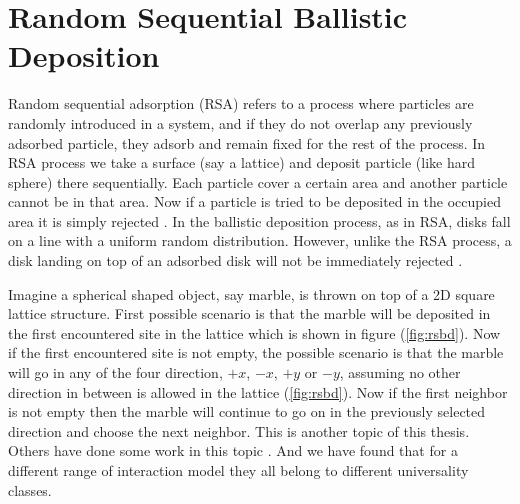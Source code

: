 		
		

\section{Random Sequential Ballistic Deposition}

	Random sequential adsorption (RSA) refers to a process where particles are randomly introduced in a system, and if they do not overlap any previously adsorbed particle, they adsorb and remain fixed for the rest of the process.	In RSA process we take a surface (say a lattice) and deposit particle (like hard sphere) there sequentially. Each particle cover a certain area and another particle cannot be in that area. Now if a particle is tried to be deposited in the occupied area it is simply rejected \cite{Renyi1958, Widom1966}.	In the ballistic deposition process, as in RSA, disks fall	on a line with a uniform random distribution. However,	unlike the RSA process, a disk landing on top of an adsorbed disk will not be immediately rejected \cite{Talbot1992}.

	Imagine a spherical shaped object, say marble, is thrown on top of a 2D square lattice structure. First possible scenario is that the marble will be deposited in the first encountered site in the lattice which is shown in figure (\ref{fig:rsbd}). Now if the first encountered site is not empty, the possible scenario is that the marble will go in any of the four direction, $+x$, $-x$, $+y$ or $-y$, assuming no other direction in between is allowed in the lattice (\ref{fig:rsbd}).  Now if the first neighbor is not empty then the marble will continue to go on in the previously selected direction and choose the next neighbor. This is another topic of this thesis. Others have done some work in this topic \cite{Choi1995, Talbot1992, Jullien1992, Viot1993}. And we have found that for a different range of interaction model they all belong to different universality classes.
	


